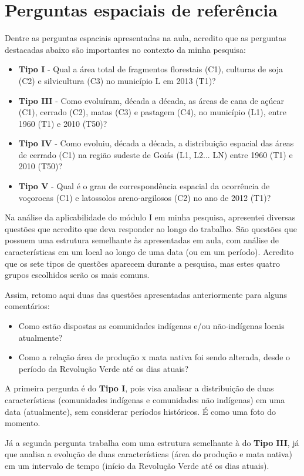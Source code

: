 \section{Perguntas espaciais de referência}

Dentre as perguntas espaciais apresentadas na aula, acredito que as perguntas destacadas abaixo são importantes no contexto da minha pesquisa:

\begin{itemize}
\item \textbf{Tipo I} - Qual a área total de fragmentos florestais (C1), culturas de soja (C2) e silvicultura (C3) no município L em 2013 (T1)?
\item \textbf{Tipo III} - Como evoluíram, década a década, as áreas de cana de açúcar (C1), cerrado (C2), matas (C3) e pastagem (C4), no município (L1), entre 1960 (T1) e 2010 (T50)?
\item \textbf{Tipo IV} - Como evoluiu, década a década, a distribuição espacial das áreas de cerrado (C1) na região sudeste de Goiás (L1, L2... LN) entre 1960 (T1) e 2010 (T50)?
\item \textbf{Tipo V} - Qual é o grau de correspondência espacial da ocorrência de voçorocas (C1) e latossolos areno-argilosos (C2) no ano de 2012 (T1)?
\end{itemize}

Na análise da aplicabilidade do módulo I em minha pesquisa, apresentei diversas questões que acredito que deva responder ao longo do trabalho. São questões que possuem uma estrutura semelhante às apresentadas em aula, com análise de características em um local ao longo de uma data (ou em um período). Acredito que os sete tipos de questões aparecem durante a pesquisa, mas estes quatro grupos escolhidos serão os mais comuns.

Assim, retomo aqui duas das questões apresentadas anteriormente para alguns comentários:

\begin{itemize}
  \item Como estão dispostas as comunidades indígenas e/ou não-indígenas locais atualmente?
  \item Como a relação área de produção x mata nativa foi sendo alterada, desde o período da Revolução Verde até os dias atuais?
\end{itemize}

A primeira pergunta é do \textbf{Tipo I}, pois visa analisar a distribuição de duas características (comunidades indígenas e comunidades não indígenas) em uma data (atualmente), sem considerar períodos históricos. É como uma foto do momento.

Já a segunda pergunta trabalha com uma estrutura semelhante à do \textbf{Tipo III}, já que analisa a evolução de duas características (área do produção e mata nativa) em um intervalo de tempo (início da Revolução Verde até os dias atuais).

